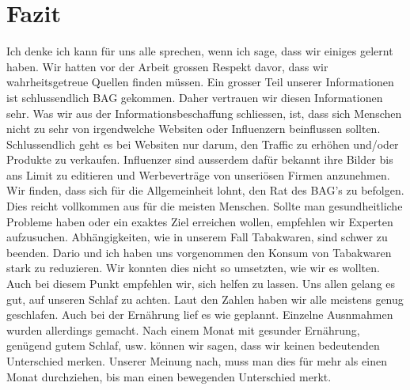 \chapter{Fazit}
\authortoc{\jonas}{\chapterident}
Ich denke ich kann für uns alle sprechen, wenn ich sage, dass wir einiges gelernt haben.
\newline
Wir hatten vor der Arbeit grossen Respekt davor, dass wir wahrheitsgetreue Quellen finden müssen. Ein grosser Teil unserer Informationen ist schlussendlich BAG gekommen. Daher vertrauen wir diesen Informationen sehr.
\newline
Was wir aus der Informationsbeschaffung schliessen, ist, dass sich Menschen nicht zu sehr von irgendwelche Websiten oder Influenzern beinflussen sollten. Schlussendlich geht es bei Websiten nur darum, den Traffic zu erhöhen und/oder Produkte zu verkaufen. Influenzer sind ausserdem dafür bekannt ihre Bilder bis ans Limit zu editieren und Werbeverträge von unseriösen Firmen anzunehmen. 
\newline
Wir finden, dass sich für die Allgemeinheit lohnt, den Rat des BAG's zu befolgen. Dies reicht vollkommen aus für die meisten Menschen. Sollte man gesundheitliche Probleme haben oder ein exaktes Ziel erreichen wollen, empfehlen wir Experten aufzusuchen.
\newline
\newline
Abhängigkeiten, wie in unserem Fall Tabakwaren, sind schwer zu beenden. Dario und ich haben uns vorgenommen den Konsum von Tabakwaren stark zu reduzieren. Wir konnten dies nicht so umsetzten, wie wir es wollten. Auch bei diesem Punkt empfehlen wir, sich helfen zu lassen.
\newline
Uns allen gelang es gut, auf unseren Schlaf zu achten. Laut den Zahlen haben wir alle meistens genug geschlafen. Auch bei der Ernährung lief es wie geplannt. Einzelne Ausnmahmen wurden allerdings gemacht.
\newline
\newline
Nach einem Monat mit gesunder Ernährung, genügend gutem Schlaf, usw. können wir sagen, dass wir keinen bedeutenden Unterschied merken. Unserer Meinung nach, muss man dies für mehr als einen Monat durchziehen, bis man einen bewegenden Unterschied merkt.